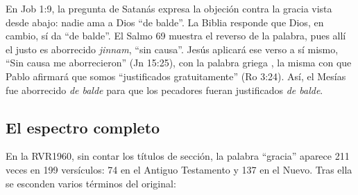 En Job 1:9, la pregunta de Satanás expresa la objeción contra la gracia vista desde abajo: nadie ama a Dios ``de balde''. La Biblia responde que Dios, en cambio, sí da ``de balde''. El Salmo 69 muestra el reverso de la palabra, pues allí el justo es aborrecido \emph{jinnam}, ``sin causa''. Jesús aplicará ese verso a sí mismo, ``Sin causa me aborrecieron'' (Jn 15:25), con la palabra griega , la misma con que Pablo afirmará que somos ``justificados gratuitamente'' (Ro 3:24). Así, el Mesías fue aborrecido \emph{de balde} para que los pecadores fueran justificados \emph{de balde}.


\subsection{El espectro completo}
En la RVR1960, sin contar los títulos de sección, la palabra ``gracia'' aparece 211 veces en 199 versículos: 74 en el Antiguo Testamento y 137 en el Nuevo. Tras ella se esconden varios términos del original:

